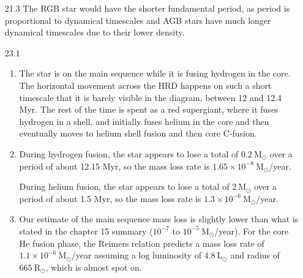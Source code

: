 \documentclass[11pt]{article}
\newcommand\lsol{\mathrm{L}_\odot}
\newcommand\rsol{\mathrm{R}_\odot}
\newcommand\msol{\mathrm{M}_\odot}
\begin{document}
\begin{enumerate}
\begin{enumerate}
    \end{enumerate}

\item [21.3]
	The RGB star would have the shorter fundamental period, as period is proportional to dynamical timescales and AGB stars have much longer dynamical timescales due to their lower density.
    
\item [23.1]
	\begin{enumerate}
	
    \item The star is on the main sequence while it is fusing hydrogen in the core. The horizontal movement across the HRD happens on such a short timescale that it is barely visible in the diagram, between 12 and 12.4 Myr. The rest of the time is spent as a red supergiant, where it fuses hydrogen in a shell, and initially fuses helium in the core and then eventually moves to helium shell fusion and then core C-fusion.
    
    \item During hydrogen fusion, the star appears to lose a total of $0.2~\msol$ over a period of about 12.15 Myr, so the mass loss rate is $1.65\times10^{-8}~\msol$/year.
    
    During helium fusion, the star appears to lose a total of $2~\msol$ over a period of about 1.5 Myr, so the mass loss rate is $1.3\times10^{-6}~\msol$/year.

    \item Our estimate of the main sequence mass loss is slightly lower than what is stated in the chapter 15 summary ($10^{-7}$ to $10^{-5}~\msol$/year). For the core He fusion phase, the Reimers relation predicts a mass loss rate of $1.1\times10^{-6}~\msol$/year assuming a log luminosity of $4.8~\lsol$ and radius of $665~\rsol$, which is almost spot on.

    \end{enumerate}

\end{enumerate}
\end{document}
